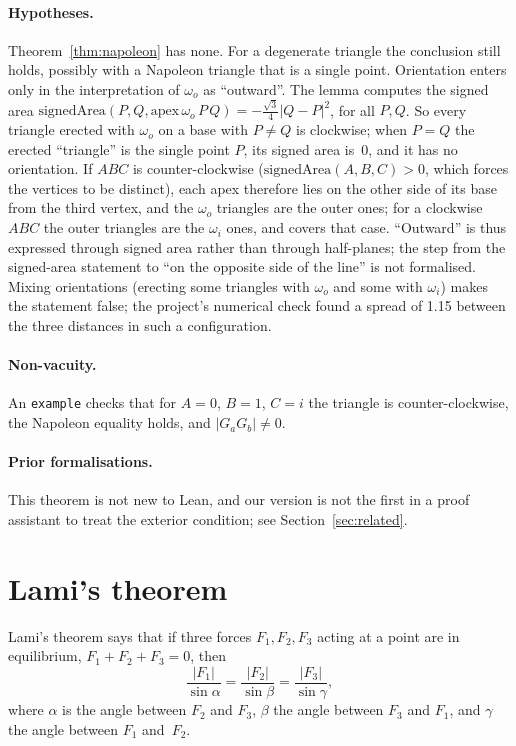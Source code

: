 \documentclass[11pt]{article}
\theoremstyle{definition}
\theoremstyle{remark}
\newcommand{\lean}[1]{\texttt{#1}}
\begin{document}
\paragraph{Hypotheses.} Theorem~\ref{thm:napoleon} has none. For a degenerate triangle the
conclusion still holds, possibly with a Napoleon triangle that is a single point. Orientation
enters only in the interpretation of $\omega_o$ as ``outward''. The lemma
 computes the signed area
$\mathrm{signedArea}(P,Q,\mathrm{apex}\,\omega_o\,P\,Q)=-\tfrac{\sqrt3}4|Q-P|^2$, for all $P,Q$. So
every triangle erected with $\omega_o$ on a base with $P\ne Q$ is clockwise; when $P=Q$ the erected
``triangle'' is the single point $P$, its signed area is~$0$, and it has no orientation. If $ABC$
is counter-clockwise ($\mathrm{signedArea}(A,B,C)>0$, which forces the vertices to be distinct),
each apex therefore lies on the other side of its base from the third vertex, and the $\omega_o$
triangles are the outer ones; for a clockwise $ABC$ the outer triangles are the $\omega_i$ ones,
and  covers that case. ``Outward'' is thus expressed through signed
area rather than through half-planes; the step from the signed-area statement to ``on the opposite
side of the line'' is not formalised. Mixing orientations (erecting some triangles with $\omega_o$
and some with $\omega_i$) makes the statement false; the project's numerical check found a spread
of 1.15 between the three distances in such a configuration.

\paragraph{Non-vacuity.} An \lean{example} checks that for $A=0$, $B=1$, $C=i$ the triangle is
counter-clockwise, the Napoleon equality holds, and $|G_aG_b|\ne0$.

\paragraph{Prior formalisations.} This theorem is not new to Lean, and our version is not the first
in a proof assistant to treat the exterior condition; see Section~\ref{sec:related}.

\section{Lami's theorem}\label{sec:lami}

Lami's theorem says that if three forces $F_1,F_2,F_3$ acting at a point are in equilibrium,
$F_1+F_2+F_3=0$, then
\[
\frac{|F_1|}{\sin\alpha}=\frac{|F_2|}{\sin\beta}=\frac{|F_3|}{\sin\gamma},
\]
where $\alpha$ is the angle between $F_2$ and $F_3$, $\beta$ the angle between $F_3$ and $F_1$, and
$\gamma$ the angle between $F_1$ and~$F_2$.
\end{document}
